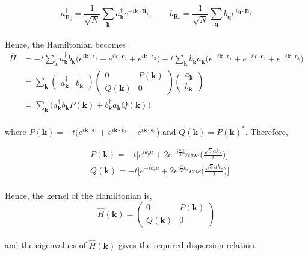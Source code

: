 \documentclass{article}
\begin{document}
\begin{equation}
a_{\textbf{R}_i}^\dagger = \frac{1}{\sqrt{N}} \sum_{\textbf{k}} a_\textbf{k}^\dagger e^{-i \textbf{k} \cdot \textbf{R}_i}, \quad  \quad  b_{\textbf{R}_i} = \frac{1}{\sqrt{N}} \sum_{\textbf{q}} b_\textbf{q} e^{i \textbf{q} \cdot \textbf{R}_i}
\end{equation}
\\
Hence, the Hamiltonian becomes
\begin{equation}
\begin{split}
\hat{H} & = -t \sum_{\textbf{k}} a_\textbf{k}^\dagger b_\textbf{k} \Big(  e^{i \textbf{k} \cdot \boldsymbol{\epsilon}_1}  + e^{i \textbf{k} \cdot \boldsymbol{\epsilon}_2} + e^{i \textbf{k} \cdot \boldsymbol{\epsilon}_3}\Big)  -t \sum_{\textbf{k}} b_\textbf{k}^\dagger a_\textbf{k}  \Big(  e^{-i \textbf{k} \cdot \boldsymbol{\epsilon}_1}  + e^{-i \textbf{k} \cdot \boldsymbol{\epsilon}_2} + e^{-i \textbf{k} \cdot \boldsymbol{\epsilon}_3}\Big)\\
 & = \sum_{\textbf{k}} \begin{pmatrix} a_\textbf{k}^\dagger & b_\textbf{k}^\dagger \end{pmatrix} \begin{pmatrix} 0 & P(\textbf{k}) \\ Q(\textbf{k}) & 0  \end{pmatrix} \begin{pmatrix} a_\textbf{k} \\ b_\textbf{k} \end{pmatrix}\\
&  = \sum_{\textbf{k}} \Big( a_\textbf{k}^\dagger b_\textbf{k} P(\textbf{k}) + b_\textbf{k}^\dagger a_\textbf{k} Q(\textbf{k}) \Big)
\end{split}
\end{equation}
\\
where $P(\textbf{k}) = -t \Big(  e^{i \textbf{k} \cdot \boldsymbol{\epsilon}_1}  + e^{i \textbf{k} \cdot \boldsymbol{\epsilon}_2} + e^{i \textbf{k} \cdot \boldsymbol{\epsilon}_3}\Big)$ and $Q(\textbf{k}) = P(\textbf{k})^{*}$. Therefore, 

\begin{equation}
\begin{split}
& P(\textbf{k}) = -t \Big[ e^{i k_y a} + 2 e^{-i \frac{a}{2} k_y} cos\Big(\frac{\sqrt{3}ak_x}{2} \Big) \Big] \\
& Q(\textbf{k}) = -t \Big[ e^{-i k_y a} + 2 e^{i \frac{a}{2} k_y} cos\Big(\frac{\sqrt{3}ak_x}{2} \Big) \Big]
\end{split}
\end{equation}
\\
Hence, the kernel of the Hamiltonian is,
\begin{equation}
\hat{H}(\textbf{k}) =  \begin{pmatrix} 0 & P(\textbf{k}) \\ Q(\textbf{k}) & 0  \end{pmatrix} 
\end{equation}
\\
and the eigenvalues of $\hat{H}(\textbf{k}) $ gives the required dispersion relation.
\end{document}
